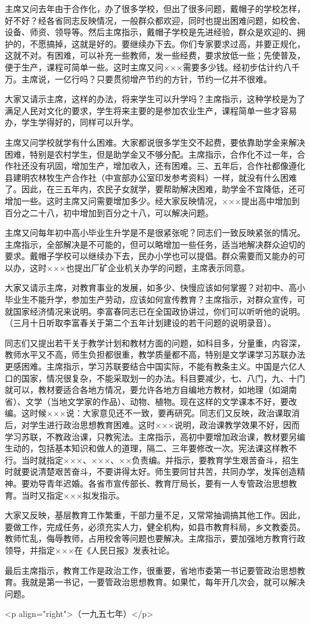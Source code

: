 主席又问去年由于合作化，办了很多学校，但出了很多问题，戴帽子的学校怎样，好不好？经各省同志反映情况，一般群众都欢迎，同时也提出困难问题，如校舍、设备、师资、领导等。然后主席指示，戴帽子学校是先进经验，群众是欢迎的、拥护的，不愿搞掉，这就是好的。要继续办下去。你们专家要求过高，并要正规化，这就不对。有困难，可以补充一些教师，发一些经费，要求放低一些；先使普及，便于生产，课程可简单一些。这时主席又问×××需要多少钱。经初步估计约八千万。主席说，一亿行吗？只要贯彻增产节约的方针，节约一亿并不很难。

大家又请示主席，这样的办法，将来学生可以升学吗？主席指示，这种学校是为了满足人民对文化的要求，学生将来主要的是参加农业生产，课程简单一些才容易办，学生学得好的，同样可以升学。

主席又问学校就学有什么困难。大家都说很多学生交不起费，要依靠助学金来解决困难，特别是农村学生，但是助学金又不够分配。主席指示，合作化不过一年，合作社还没有巩固，增加生产，增加收入，还有困难。三、五年后，合作社都像遵化县建明农林牧生产合作社（中宣部办公室印发参考资料）一样，就没有什么困难了。因此，在三五年内，农民子女就学，要帮助解决困难，助学金不宜降低，还可增加一些。这时主席又问需要增加多少。经大家反映情况，×××提出高中增加到百分之二十八，初中增加到百分之十八，可以解决问题。

主席又问每年初中高小毕业生升学是不是很紧张呢？同志们一致反映紧张的情况。主席指示，全部解决是不可能的，但可以略增加一些任务，适当地解决群众迫切的要求。戴帽子学校可以继续办下去，民办小学也可以提倡。群众需要而又能办的可以办，这时×××也提出厂矿企业机关办学的问题，主席表示同意。

大家又请示主席，对教育事业的发展，如多少、快慢应该如何掌握？对初中、高小毕业生不能升学，参加生产劳动，应该如何宣传教育？主席指示，对群众宣传，可就国家经济情况来说明。李富春同志已在全国政协讲过，你们可以听听他的说明。（三月十日听取李富春关于第二个五年计划建设的若干问题的说明录音）。

同志们又提出若干关于教学计划和教材方面的问题，如科目多，分量重，内容深，教师水平又不高，师生负担都很重，教学质量都不高，特别是文学课学习苏联办法更感困难。主席指示，学习苏联要结合中国实际，不能有教条主义。中国是六亿人口的国家，情况很复杂，不能采取划一的办法。科目要减少，七、八门，九、十门就可以，教材要适合各地方情况，要允许各地方自编地方教材，如地理（如湖南省）、文学（当地文学家的作品）、动物、植物。现在这样的文学课本不好，要改编。这时候×××说：大家意见还不一致，要再研究。同志们又反映，政治课取消后，对学生进行政治思想教育困难。这时×××说明，政治课教学效果不好，因而学习苏联，不教政治课，只教宪法。主席指示，高初中要增加政治课，教材要另编生动的，包括基本知识和做人的道理，隔二、三年要修改一次。宪法课这样教不行。当时就指定×××、×××、××负责编。并指示，要教育学生艰苦奋斗，招生时就要说清楚艰苦奋斗，不要讲得太好。师生要同甘共苦，共同办学，发挥创造精神。要劝导青年迟婚。各省市宣传部长、教育厅局长，要有一人专管政治思想教育。当时又指定×××拟发指示。

大家又反映，基层教育工作繁重，干部力量不足，又常常抽调搞其他工作。因此，要做工作，完成任务，必须充实人力，健全机构，如县市教育科局，乡文教委员。教师忙乱，侮辱教师，占用校舍等问题也要解决。主席指示，要加强地方教育行政领导，并指定×××在《人民日报》发表社论。

最后主席指示，教育工作是政治工作，很重要，省地市委第一书记要管政治思想教育。我就是第一书记，一要管政治思想教育。如果忙，每年开几次会，就可以解决问题。

<p align="right">（一九五七年）</p>



